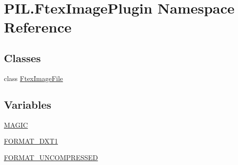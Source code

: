 \hypertarget{namespacePIL_1_1FtexImagePlugin}{}\section{P\+I\+L.\+Ftex\+Image\+Plugin Namespace Reference}
\label{namespacePIL_1_1FtexImagePlugin}
\subsection*{Classes}
\begin{DoxyCompactItemize}
\item 
class \hyperlink{classPIL_1_1FtexImagePlugin_1_1FtexImageFile}{Ftex\+Image\+File}
\end{DoxyCompactItemize}
\subsection*{Variables}
\begin{DoxyCompactItemize}
\item 
\hyperlink{namespacePIL_1_1FtexImagePlugin_ac6dd80ba5b83d90cb59a22944884072e}{M\+A\+G\+IC}
\item 
\hyperlink{namespacePIL_1_1FtexImagePlugin_a3423bf78d6db48c6f5876fd46cc0e970}{F\+O\+R\+M\+A\+T\+\_\+\+D\+X\+T1}
\item 
\hyperlink{namespacePIL_1_1FtexImagePlugin_a5a33d8acad23d85fd665fd0915624681}{F\+O\+R\+M\+A\+T\+\_\+\+U\+N\+C\+O\+M\+P\+R\+E\+S\+S\+ED}
\end{DoxyCompactItemize}



